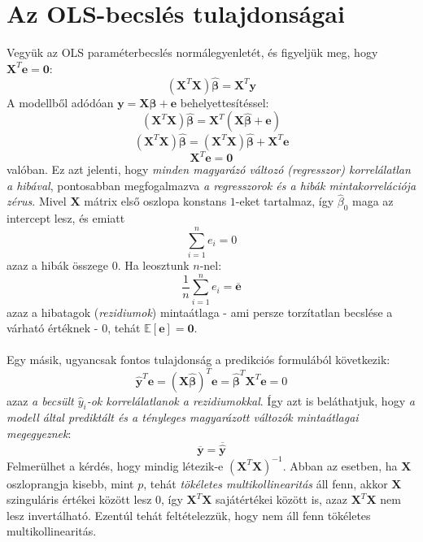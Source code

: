 \documentclass[14p]{report}
\def\pmb{\boldsymbol}
\def\ebeta{\hat{\pmb{\beta}}}
\def\bar{\overline}
\begin{document}
\section{Az OLS-becslés tulajdonságai}
Vegyük az OLS paraméterbecslés normálegyenletét, és figyeljük meg, hogy $\pmb{X}^T\pmb{e} = \pmb{0}$:
\[
	(\pmb{X}^T\pmb{X})\ebeta = \pmb{X}^T\pmb{y}
\]
A modellből adódóan $\pmb{y} = \pmb{X}\ebeta + \pmb{e}$ behelyettesítéssel:
\[
	(\pmb{X}^T\pmb{X})\ebeta = \pmb{X}^T(\pmb{X}\ebeta + \pmb{e})
\]
\[
	(\pmb{X}^T\pmb{X})\ebeta = (\pmb{X}^T\pmb{X})\ebeta + \pmb{X}^T\pmb{e}
\]
\[
	\pmb{X}^T\pmb{e} = \pmb{0}
\]
valóban. Ez azt jelenti, hogy \emph{minden magyarázó változó (regresszor) korrelálatlan a hibával}, pontosabban megfogalmazva \emph{a regresszorok és a hibák mintakorrelációja zérus}. Mivel $\pmb{X}$ mátrix első oszlopa konstans $1$-eket tartalmaz, így $\hat{\beta}_0$ maga az intercept lesz, és emiatt 
\[
	\sum_{i=1}^{n}e_i = 0
\]
azaz a hibák összege $0$. Ha leosztunk $n$-nel:
\[
	\frac{1}{n}\sum_{i=1}^{n}e_i = \bar{\pmb{e}}
\]
azaz a hibatagok (\emph{rezidiumok}) mintaátlaga - ami persze torzítatlan becslése a várható értéknek - $0$, tehát $\mathbb{E}[\pmb{e}] = \pmb{0}$.
\\
\\
Egy másik, ugyancsak fontos tulajdonság a predikciós formulából következik:
\[
	\hat{\pmb{y}}^T\pmb{e} = (\pmb{X}\ebeta)^T\pmb{e} = \ebeta^T\pmb{X}^T\pmb{e} = 0
\]
azaz \emph{a becsült $\hat{y}_i$-ok korrelálatlanok a rezidiumokkal}. Így azt is beláthatjuk, hogy \emph{a modell által prediktált és a tényleges magyarázott változók mintaátlagai megegyeznek}:
\[
	\bar{\pmb{y}} = \bar{\hat{\pmb{y}}}
\]
Felmerülhet a kérdés, hogy mindig létezik-e $(\pmb{X}^T\pmb{X})^{-1}$. Abban az esetben, ha $\pmb{X}$ oszloprangja kisebb, mint $p$, tehát \emph{tökéletes multikollinearitás} áll fenn, akkor $\pmb{X}$ szinguláris értékei között lesz $0$, így $\pmb{X}^T\pmb{X}$ sajátértékei között is, azaz $\pmb{X}^T\pmb{X}$ nem lesz invertálható. Ezentúl tehát feltételezzük, hogy nem áll fenn tökéletes multikollinearitás.
\end{document}
